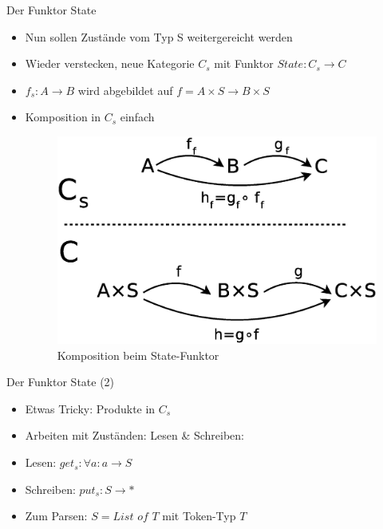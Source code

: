 \documentclass{beamer}
\begin{document}
\begin{frame}{Der Funktor State}
  \begin{itemize}
  \item Nun sollen Zustände vom Typ S weitergereicht werden
  \item Wieder verstecken, neue Kategorie $C_{s}$ mit Funktor
    $State : C_{s} \rightarrow C$
  \item $f_{s} : A \rightarrow B$ wird abgebildet auf
    $f = A \times S \rightarrow B \times S$
  \item Komposition in $C_{s}$ einfach
    \begin{figure}
      \centering
      \includegraphics[scale=0.2]{images/cat_state}
      \caption{Komposition beim State-Funktor}
    \end{figure}
  \end{itemize}
\end{frame}

\begin{frame}{Der Funktor State (2)}
  \begin{itemize}
  \item Etwas Tricky: Produkte in $C_{s}$
  \item Arbeiten mit Zuständen: Lesen \& Schreiben:
  \item Lesen: $get_s : \forall a : a \rightarrow S$
  \item Schreiben: $put_s : S \rightarrow *$
  \item Zum Parsen: $S = List$ $of$ $T$ mit Token-Typ $T$
  \end{itemize}
\end{frame}
\end{document}
